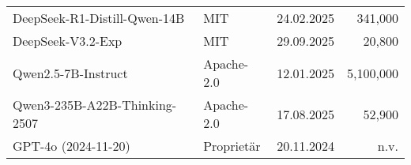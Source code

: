 \begin{sidewaystable}[htbp]
\begin{threeparttable}
\begin{subtable}[t]{0.49\linewidth}
\begin{tabular}{@{}p{6.3cm} l r r@{}}
                DeepSeek-R1-Distill-Qwen-14B & MIT & 24.02.2025 & 341{,}000 \cite{HF_DeepSeekR1_Distill_Qwen14B_2025} \\
                DeepSeek-V3.2-Exp & MIT & 29.09.2025 & 20{,}800 \cite{HF_DeepSeek_V3_2_2025} \\
                Qwen2.5-7B-Instruct & Apache-2.0 & 12.01.2025 & 5{,}100{,}000 \cite{HF_Qwen7B_2025} \\
                Qwen3-235B-A22B-Thinking-2507 & Apache-2.0 & 17.08.2025 & 52{,}900 \cite{HF_Qwen3_235B_2025} \\
                GPT-4o (2024-11-20) & Proprietär & 20.11.2024 & n.v. \cite{openai-hello-gpt-4o} \\
                \bottomrule
            \end{tabular}
        \end{subtable}
    \end{threeparttable}
\end{sidewaystable}